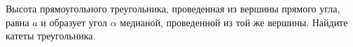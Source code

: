 \begin{ex}
	\begin{condition}
		Высота прямоугольного треугольника, проведенная	из вершины прямого угла, равна \( a  \) и образует угол \( \alpha \) медианой, проведенной из той же вершины. Найдите катеты треугольника.
	\end{condition}
\end{ex}